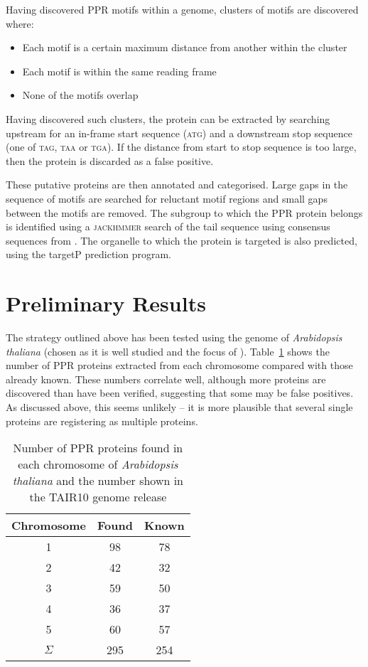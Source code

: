 \documentclass[twoside,a4paper]{article}
\begin{document}
\begin{multicols}{2}
Having discovered PPR motifs within a genome, clusters of motifs are discovered
where:
\begin{itemize}
  \item Each motif is a certain maximum distance from another within the
    cluster
  \item Each motif is within the same reading frame
  \item None of the motifs overlap
\end{itemize}
Having discovered such clusters, the protein can be extracted by searching
upstream for an in-frame start sequence (\textsc{atg}) and a downstream stop 
sequence (one of \textsc{tag}, \textsc{taa} or \textsc{tga}).
If the distance from start to stop sequence is too large, then the protein is
discarded as a false positive.

These putative proteins are then annotated and categorised.
Large gaps in the sequence of motifs are searched for reluctant motif regions
and small gaps between the motifs are removed.
The subgroup to which the PPR protein belongs is identified using a
\textsc{jackhmmer} search of the tail sequence using consensus sequences 
from \cite{Lurin2004}.
The organelle to which the protein is targeted is also predicted, using the
targetP prediction program.

\section{Preliminary Results}
\label{sec:results}

The strategy outlined above has been tested using the genome of 
\textit{Arabidopsis thaliana} (chosen as it is well studied and the focus of
\cite{Lurin2004}). 
Table~\ref{tab:CHR} shows the number of PPR proteins
extracted from each chromosome compared with those already known.
These numbers correlate well, although more proteins are discovered than have
been verified, suggesting that some may be false positives.
As discussed above, this seems unlikely -- it is more plausible that several
single proteins are registering as multiple proteins.

\begin{table}[H]
  \centering
  \begin{tabular}{c|c|c}
    Chromosome & Found & Known \\
    \hline
    1 & 98 & 78 \\
    2 & 42 & 32 \\
    3 & 59 & 50 \\
    4 & 36 & 37 \\
    5 & 60 & 57 \\
    \hline
    $\Sigma$ & 295 & 254 \\
  \end{tabular}
  \caption{Number of PPR proteins found in each chromosome of 
    \textit{Arabidopsis thaliana} and the number shown in the TAIR10 genome
    release}
  \label{tab:CHR}
\end{table}


\end{multicols}
\end{document}
